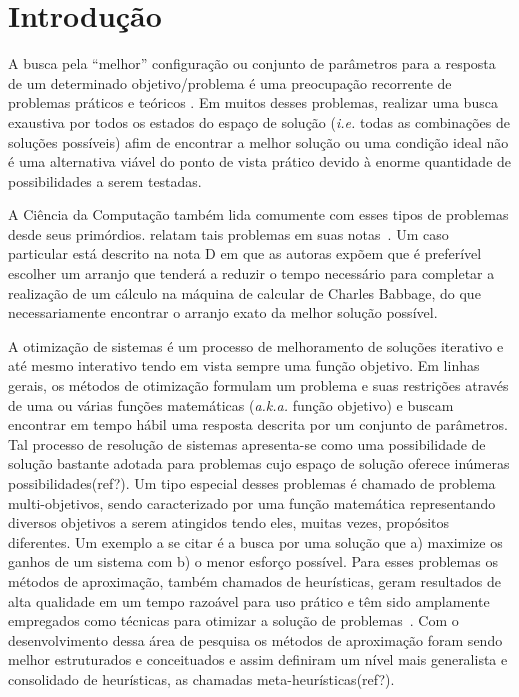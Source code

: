 \chapter[Introdução]{Introdução}

A busca pela ``melhor'' configuração ou conjunto de parâmetros para a resposta de um determinado objetivo/problema é uma preocupação recorrente de problemas práticos e teóricos \cite{combinatorialoptimization1998}. Em muitos desses problemas, realizar uma busca exaustiva por todos os estados do espaço de solução (\textit{i.e.} todas as combinações de soluções possíveis) afim de encontrar a melhor solução ou uma condição ideal não é uma alternativa viável do ponto de vista prático devido à enorme quantidade de possibilidades a serem testadas. 

A Ciência da Computação também lida comumente com esses tipos de problemas desde seus primórdios.  relatam tais problemas em suas notas~\cite{menabrea1842sketch}. Um caso particular está descrito na nota D em que as autoras expõem que é preferível escolher um arranjo que tenderá a reduzir o tempo necessário para completar a realização de um cálculo na máquina de calcular de Charles Babbage, do que necessariamente encontrar o arranjo exato da melhor solução possível\cite{menabrea1842sketch}.

A otimização de sistemas é um processo de melhoramento de soluções iterativo e até mesmo interativo tendo em vista sempre uma função objetivo. Em linhas gerais, os métodos de otimização formulam um problema e suas restrições através de uma ou várias funções matemáticas (\textit{a.k.a.} função objetivo) e buscam encontrar em tempo hábil uma resposta descrita por um conjunto de parâmetros.  Tal processo de resolução de sistemas apresenta-se como uma possibilidade de solução bastante adotada para problemas cujo espaço de solução oferece inúmeras possibilidades(ref?).  Um tipo especial desses problemas é chamado de problema multi-objetivos, sendo caracterizado por uma função matemática representando diversos objetivos a serem atingidos tendo eles, muitas vezes, propósitos diferentes. Um exemplo a se citar é a busca por uma solução que a) maximize os ganhos de um sistema com b) o menor esforço possível.  Para esses problemas os métodos de aproximação, também chamados de heurísticas, geram resultados de alta qualidade em um tempo razoável para uso prático e têm sido amplamente empregados como técnicas para otimizar a solução de problemas~\cite{gendreau2005metaheuristics}. Com o desenvolvimento dessa área de pesquisa os métodos de aproximação foram sendo melhor estruturados e conceituados e assim definiram um nível mais generalista e consolidado de heurísticas, as chamadas meta-heurísticas(ref?).

